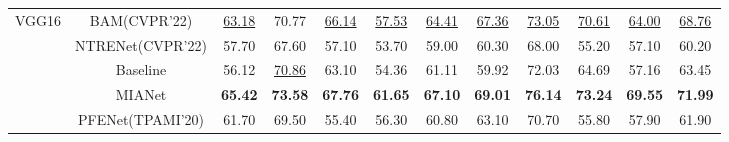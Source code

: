 \documentclass[10pt,twocolumn,letterpaper]{article}
\begin{document}
\begin{table*}[htbp]
\begin{tabular}{c|ccccccccccc}
		VGG16                      & \multicolumn{1}{c|}{BAM(CVPR'22)\cite{bam}}                          & \underline{63.18}                                  & 70.77                                  & \underline{66.14}                                  & \underline{57.53}                                  & \multicolumn{1}{c|}{\underline{64.41}}                                  &\underline{67.36}                & \underline{73.05}                                  & \underline{70.61}               & \underline{64.00}                                  & \underline{68.76}               \\
		& \multicolumn{1}{c|}{NTRENet(CVPR'22)\cite{ntre}}                         & 57.70                                  & 67.60                                  & 57.10                                  & 53.70                                  & \multicolumn{1}{c|}{59.00}                                  & 60.30                         & 68.00                                  & 55.20                         & 57.10                                  & 60.20                         \\
		& \multicolumn{1}{c|}{Baseline}                     & 56.12                                  & \underline{70.86}                                  & 63.10                                  & 54.36                                  & \multicolumn{1}{c|}{61.11}                                  & 59.92                         & 72.03                                  & 64.69                         & 57.16                                  & 63.45                         \\
		& \multicolumn{1}{c|}{\cellcolor[HTML]{EFEFEF}MIANet} & \cellcolor[HTML]{EFEFEF}\textbf{65.42} & \cellcolor[HTML]{EFEFEF}\textbf{73.58} & \cellcolor[HTML]{EFEFEF}\textbf{67.76} & \cellcolor[HTML]{EFEFEF}\textbf{61.65} & \multicolumn{1}{c|}{\cellcolor[HTML]{EFEFEF}\textbf{67.10}} & \cellcolor[HTML]{EFEFEF}\textbf{69.01} & \cellcolor[HTML]{EFEFEF}\textbf{76.14} & \cellcolor[HTML]{EFEFEF}\textbf{73.24} & \cellcolor[HTML]{EFEFEF}\textbf{69.55} & \cellcolor[HTML]{EFEFEF}\textbf{71.99} \\ \hline \hline
		& \multicolumn{1}{c|}{PFENet(TPAMI'20)\cite{pfenet}}                       & 61.70                                  & 69.50                                  & 55.40                                  & 56.30                                  & \multicolumn{1}{c|}{60.80}                                  & 63.10                         & 70.70                                  & 55.80                         & 57.90                                  & 61.90                         \\

\end{tabular}
\end{table*}
\end{document}
